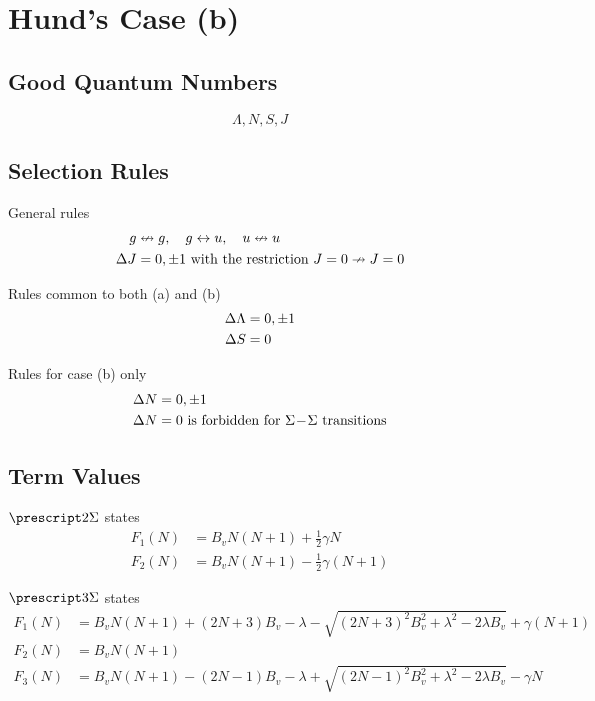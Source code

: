 \section{Hund's Case (b)}
\label{s:hunds_case_b}

\subsection{Good Quantum Numbers}

\begin{equation*}
    \Lambda, N, S, J
\end{equation*}

\subsection{Selection Rules}

General rules
\begin{align*}
    g &\nleftrightarrow g, \quad g \leftrightarrow u, \quad u \nleftrightarrow u \\
    \adif{J} &= 0, \pm 1 \text{ with the restriction } J = 0 \nrightarrow J = 0
\end{align*}

Rules common to both (a) and (b)
\begin{align*}
    \adif{\Lambda} &= 0, \pm 1 \\
    \adif{S} &= 0
\end{align*}

Rules for case (b) only
\begin{align*}
    \adif{N} &= 0, \pm 1 \\
    \adif{N} &= 0 \text{ is forbidden for } \Sigma\dash\Sigma \text{ transitions}
\end{align*}

\subsection{Term Values}

$\state{2}{\Sigma}$ states
\begin{align*}
    F_1(N) &= B_vN(N + 1) + \tfrac{1}{2}\gamma N \\
    F_2(N) &= B_vN(N + 1) - \tfrac{1}{2}\gamma(N + 1)
\end{align*}

$\state{3}{\Sigma}$ states
\begin{align*}
    F_1(N) &= B_vN(N + 1) + (2N + 3)B_v - \lambda - \sqrt{(2N + 3)^2B_v^2 + \lambda^2 - 2\lambda B_v} + \gamma(N + 1) \\
    F_2(N) &= B_vN(N + 1) \\
    F_3(N) &= B_vN(N + 1) - (2N - 1)B_v - \lambda + \sqrt{(2N - 1)^2B_v^2 + \lambda^2 - 2\lambda B_v} - \gamma N
\end{align*}
